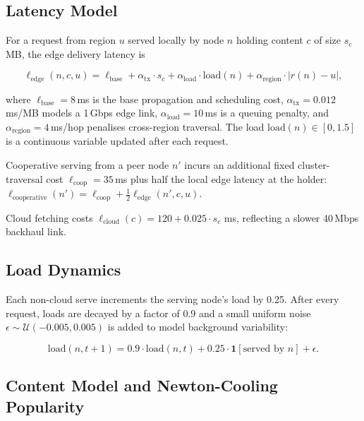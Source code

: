 \documentclass[conference]{IEEEtran}
\begin{document}
\subsection{Latency Model}

For a request from region $u$ served locally by node $n$ holding
content $c$ of size $s_c$\,MB, the edge delivery latency is

\begin{equation}
  \ell_{\mathrm{edge}}(n,c,u) =
    \ell_{\mathrm{base}}
    + \alpha_{\mathrm{tx}} \cdot s_c
    + \alpha_{\mathrm{load}} \cdot \mathrm{load}(n)
    + \alpha_{\mathrm{region}} \cdot |r(n) - u|,
  \label{eq:latency}
\end{equation}

where $\ell_{\mathrm{base}} = 8$\,ms is the base propagation and
scheduling cost, $\alpha_{\mathrm{tx}} = 0.012$\,ms/MB models a
1\,Gbps edge link, $\alpha_{\mathrm{load}} = 10$\,ms is a queuing
penalty, and $\alpha_{\mathrm{region}} = 4$\,ms/hop penalises
cross-region traversal.  The load $\mathrm{load}(n) \in [0, 1.5]$ is
a continuous variable updated after each request.

Cooperative serving from a peer node $n'$ incurs an additional fixed
cluster-traversal cost $\ell_{\mathrm{coop}} = 35$\,ms plus half the
local edge latency at the holder:
$\ell_{\mathrm{cooperative}}(n') = \ell_{\mathrm{coop}} +
\frac{1}{2}\ell_{\mathrm{edge}}(n',c,u)$.

Cloud fetching costs $\ell_{\mathrm{cloud}}(c) = 120 + 0.025 \cdot s_c$
ms, reflecting a slower 40\,Mbps backhaul link.

\subsection{Load Dynamics}

Each non-cloud serve increments the serving node's load by 0.25.
After every request, loads are decayed by a factor of 0.9 and a small
uniform noise $\epsilon \sim \mathcal{U}(-0.005, 0.005)$ is added to
model background variability:

\begin{equation}
  \mathrm{load}(n, t+1) = 0.9 \cdot \mathrm{load}(n, t) + 0.25 \cdot
  \mathbf{1}[\text{served by } n] + \epsilon.
  \label{eq:load}
\end{equation}

\subsection{Content Model and Newton-Cooling Popularity}
\end{document}
